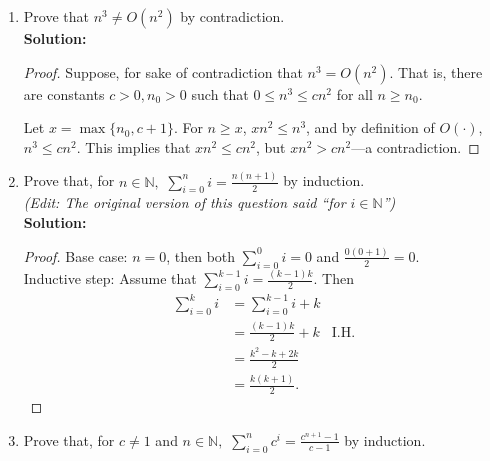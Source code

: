\documentclass[letterpaper,11pt]{article}
\begin{document}
\begin{enumerate}
\begin{proof}
($\Leftarrow$) Suppose $g(n) = \Omega(f(n))$, then there are positive constants $c_1,n_1$ such that $0\leq c_1f(n) \leq g(n)$ for all $n\geq n_1$.

Since $c_1>0$, it is also the case that $0\leq f(n) \leq \frac{1}{c_1}g(n)$ for all $n\geq n_1$. Therefore, for constants $c=\frac{1}{c_1}>0, n_0 = n_1>0$, we have that $0\leq f(n) \leq cg(n)$. Hence, $f(n) = O(g(n))$.
\end{proof}

\newpage
\item Prove that $n^3 \neq O(n^2)$ by contradiction.\\

\textbf{Solution:}
\begin{proof}
Suppose, for sake of contradiction that $n^3 = O(n^2)$. That is, there are constants $c>0,n_0>0$ such that $0\leq n^3\leq cn^2$ for all $n\geq n_0$.

Let $x = \max\{n_0,c+1\}$. For $n \geq x$, $xn^2 \leq n^3$, and by definition of $O(\cdot)$, $n^3 \leq cn^2$. This implies that $xn^2 \leq cn^2$, but $xn^2 > cn^2$---a contradiction.
\end{proof}

\vspace*{6cm}
\item Prove that, for $n \in \mathbb{N},\,\,\sum_{i=0}^{n}i = \frac{n(n+1)}{2}$ by induction.\\
\emph{(Edit: The original version of this question said ``for $i\in \mathbb{N}$'')}\\

\textbf{Solution:}
\begin{proof}
Base case: $n=0$, then both $\sum_{i=0}^{0}i = 0$ and $\frac{0(0+1)}{2} = 0$.\\

Inductive step: Assume that $\sum_{i=0}^{k-1}i = \frac{(k-1)k}{2}$. Then
\begin{align*}
\sum_{i=0}^{k}i &= \sum_{i=0}^{k-1}i + k&\\
                &= \frac{(k-1)k}{2} + k&\text{I.H.}\\
                &= \frac{k^2-k + 2k}{2}&\\
                &= \frac{k(k+1)}{2}.&
\end{align*}
\end{proof}

\newpage
\item Prove that, for $c\neq 1$ and $n \in \mathbb{N},\,\,\sum_{i=0}^{n}c^i = \frac{c^{n+1} - 1}{c - 1}$ by induction.\\


\end{enumerate}
\end{document}
